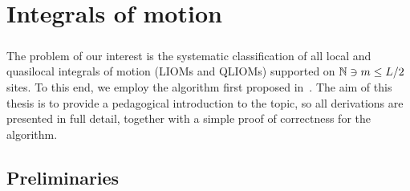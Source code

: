 \chapter{Integrals of motion}
\thispagestyle{chapterBeginStyle}

\paragraph{}The problem of our interest is the systematic classification of all local and quasilocal integrals of
motion (LIOMs and QLIOMs) supported on \(\mathbb{N} \ni m \leq L/2\) sites. To this end, we employ the algorithm first proposed
in~\textcite{Mierzejewski2015a}. The aim of this thesis is to provide a pedagogical introduction to the topic, 
so all derivations are presented in full detail, together with a simple proof of correctness for the algorithm.


\section{Preliminaries}

